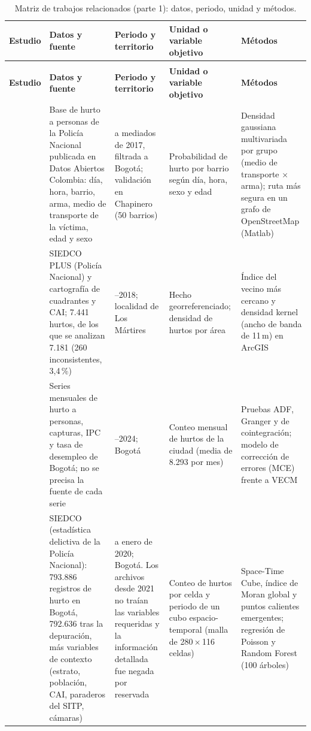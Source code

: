 {\footnotesize
\setlength{\tabcolsep}{4pt}
\renewcommand{\arraystretch}{1.15}
\begin{longtable}{@{}>{\raggedright\arraybackslash}p{2.2cm}>{\raggedright\arraybackslash}p{4.0cm}>{\raggedright\arraybackslash}p{2.4cm}>{\raggedright\arraybackslash}p{2.9cm}>{\raggedright\arraybackslash}p{3.0cm}@{}}
\caption{Matriz de trabajos relacionados (parte 1): datos, periodo, unidad y métodos.}\label{tab:matriz-datos}\\
\toprule
\textbf{Estudio} & \textbf{Datos y fuente} & \textbf{Periodo y territorio} & \textbf{Unidad o variable objetivo} & \textbf{Métodos} \\
\midrule
\endfirsthead
\multicolumn{5}{@{}l}{\emph{Tabla~\ref{tab:matriz-datos} (continuación)}}\\
\toprule
\textbf{Estudio} & \textbf{Datos y fuente} & \textbf{Periodo y territorio} & \textbf{Unidad o variable objetivo} & \textbf{Métodos} \\
\midrule
\endhead
\bottomrule
\endfoot
\citet{campo2017} & Base de hurto a personas de la Policía Nacional publicada en Datos Abiertos Colombia: día, hora, barrio, arma, medio de transporte de la víctima, edad y sexo & 2010 a mediados de 2017, filtrada a Bogotá; validación en Chapinero (50 barrios) & Probabilidad de hurto por barrio según día, hora, sexo y edad & Densidad gaussiana multivariada por grupo (medio de transporte $\times$ arma); ruta más segura en un grafo de OpenStreetMap (Matlab) \\
\addlinespace
\citet{fonseca2019} & SIEDCO PLUS (Policía Nacional) y cartografía de cuadrantes y CAI; 7.441 hurtos, de los que se analizan 7.181 (260 inconsistentes, 3,4\,\%) & 2017--2018; localidad de Los Mártires & Hecho georreferenciado; densidad de hurtos por área & Índice del vecino más cercano y densidad kernel (ancho de banda de 11\,m) en ArcGIS \\
\addlinespace
\citet{garzon2025} & Series mensuales de hurto a personas, capturas, IPC y tasa de desempleo de Bogotá; no se precisa la fuente de cada serie & 2015--2024; Bogotá & Conteo mensual de hurtos de la ciudad (media de 8.293 por mes) & Pruebas ADF, Granger y de cointegración; modelo de corrección de errores (MCE) frente a VECM \\
\addlinespace
\citet{martinez2025} & SIEDCO (estadística delictiva de la Policía Nacional): 793.886 registros de hurto en Bogotá, 792.636 tras la depuración, más variables de contexto (estrato, población, CAI, paraderos del SITP, cámaras) & 2010 a enero de 2020; Bogotá. Los archivos desde 2021 no traían las variables requeridas y la información detallada fue negada por reservada & Conteo de hurtos por celda y periodo de un cubo espacio-temporal (malla de 280\,$\times$\,116 celdas) & Space-Time Cube, índice de Moran global y puntos calientes emergentes; regresión de Poisson y Random Forest (100 árboles) \\

\end{longtable}}
